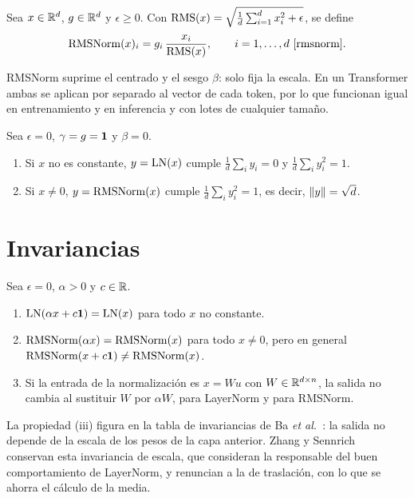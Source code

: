 \begin{definicion}[RMSNorm]\label{def:rmsnorm}
Sea $x\in\mathbb{R}^{d}$, $g\in\mathbb{R}^{d}$ y $\epsilon\ge 0$. Con $\operatorname{RMS}(x)=\sqrt{\frac1d\sum_{i=1}^{d}x_i^{2}+\epsilon}$, se define
\[
\operatorname{RMSNorm}(x)_i=g_i\,\frac{x_i}{\operatorname{RMS}(x)},\qquad i=1,\dots,d~\cite{rmsnorm}.
\]
\end{definicion}

RMSNorm suprime el centrado y el sesgo $\beta$: solo fija la escala. En un Transformer ambas se aplican por separado al vector de cada token, por lo que funcionan igual en entrenamiento y en inferencia y con lotes de cualquier tamaño.

\addtocounter{definicion}{1}%

\begin{proposicion}\label{prop:estad-salida}
Sea $\epsilon=0$, $\gamma=g=\mathbf{1}$ y $\beta=0$.
\begin{enumerate}
  \item Si $x$ no es constante, $y=\operatorname{LN}(x)$ cumple $\frac1d\sum_iy_i=0$ y $\frac1d\sum_iy_i^{2}=1$.
  \item Si $x\ne 0$, $y=\operatorname{RMSNorm}(x)$ cumple $\frac1d\sum_iy_i^{2}=1$, es decir, $\lVert y\rVert=\sqrt d$.
\end{enumerate}
\end{proposicion}

\section{Invariancias}

\begin{proposicion}[Invariancias]\label{prop:invariancias}
Sea $\epsilon=0$, $\alpha>0$ y $c\in\mathbb{R}$.
\begin{enumerate}
  \item $\operatorname{LN}(\alpha x+c\mathbf{1})=\operatorname{LN}(x)$ para todo $x$ no constante.
  \item $\operatorname{RMSNorm}(\alpha x)=\operatorname{RMSNorm}(x)$ para todo $x\ne 0$, pero en general $\operatorname{RMSNorm}(x+c\mathbf{1})\ne\operatorname{RMSNorm}(x)$.
  \item Si la entrada de la normalización es $x=Wu$ con $W\in\mathbb{R}^{d\times n}$, la salida no cambia al sustituir $W$ por $\alpha W$, para LayerNorm y para RMSNorm.
\end{enumerate}
\end{proposicion}

La propiedad (iii) figura en la tabla de invariancias de Ba \emph{et al.}~\cite[§5.1]{layernorm}: la salida no depende de la escala de los pesos de la capa anterior. Zhang y Sennrich~\cite{rmsnorm} conservan esta invariancia de escala, que consideran la responsable del buen comportamiento de LayerNorm, y renuncian a la de traslación, con lo que se ahorra el cálculo de la media.

